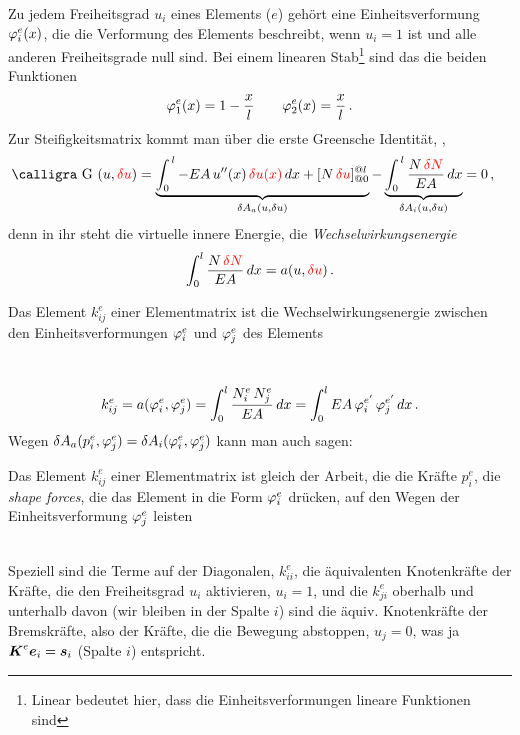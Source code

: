 Zu jedem Freiheitsgrad $u_i$ eines Elements ($e$) geh\"{o}rt eine Einheitsverformung $\varphi_i^e(x)$, die die Verformung des Elements beschreibt, wenn $u_i = 1$ ist und alle anderen Freiheitsgrade null sind. Bei einem linearen Stab\footnote{Linear bedeutet hier, dass die Einheitsverformungen lineare Funktionen sind} sind das die beiden Funktionen
\begin{align}
\varphi_1^e(x) = 1 - \frac{x}{l} \qquad \varphi_2^e(x) = \frac{x}{l}\,.
\end{align}
Zur Steifigkeitsmatrix kommt man \"{u}ber die erste Greensche Identit\"{a}t, \cite{HaJa2},
\begin{align}\label{Eq106}
\text{\normalfont\calligra G\,\,}(u,\textcolor{red}{\delta u}) &= \underbrace{\int_0^{\,l} - EA\,u''(x)\,\textcolor{red}{\delta u(x)}\,dx + [N\,\textcolor{red}{\delta u}]_{@0}^{@l}}_{\delta A_a(u, \delta u)} - \underbrace{\int_0^{\,l} \frac{N\,\textcolor{red}{\delta N}}{EA}\,dx}_{ \delta A_i(u,\delta u)} = 0\,,
\end{align}
denn in ihr steht die virtuelle innere Energie, die  {\em Wechselwirkungsenergie\/}
\begin{align}
\int_{0}^{l} \frac{N\,\textcolor{red}{\delta N}}{EA}\,dx = a(u, \textcolor{red}{\delta u})\,.
\end{align}

\hspace*{-12pt}\colorbox{highlightBlue}{\parbox{0.98\textwidth}{ Das Element $k_{ij}^e$ einer Elementmatrix ist die Wechselwirkungsenergie zwischen den Einheitsverformungen $\varphi_i^e$ und $\varphi_j^e$ des Elements}}\\
\begin{align}
k_{ij}^e = a(\varphi_i^e,\varphi_j^e) = \int_{0}^{l}\frac{N_i^e\,N_j^e}{EA}\,dx = \int_{0}^{l}EA\,\varphi_i^{e'}\,\varphi_j^{e'}\,dx\,.
\end{align}
Wegen $\delta A_a(p_i^e,\varphi_j^e) = \delta A_i(\varphi_i^e,\varphi_j^e)$ kann man auch sagen:\\

\hspace*{-12pt}\colorbox{highlightBlue}{\parbox{0.98\textwidth}{ Das Element $k_{ij}^e$ einer Elementmatrix ist gleich der Arbeit, die die Kr\"{a}fte $p_i^e$, die {\em shape forces\/}, die das Element in die Form $\varphi_i^e$ dr\"{u}cken, auf den Wegen der Einheitsverformung $\varphi_j^e$ leisten}}\\

Speziell sind die Terme auf der Diagonalen, $k_{ii}^e$, die \"{a}quivalenten Knotenkr\"{a}fte der Kr\"{a}fte, die den Freiheitsgrad $u_i$ aktivieren, $u_i = 1$, und die $k_{ji}^e$ oberhalb und unterhalb davon (wir bleiben in der Spalte $i$) sind die \"{a}quiv. Knotenkr\"{a}fte der Bremskr\"{a}fte, also der Kr\"{a}fte, die die Bewegung abstoppen, $u_j = 0$, was ja $\mbox{\boldmath $K$}^e \mbox{\boldmath $e$}_i = \mbox{\boldmath $s$}_i$ (Spalte $i$) entspricht.

